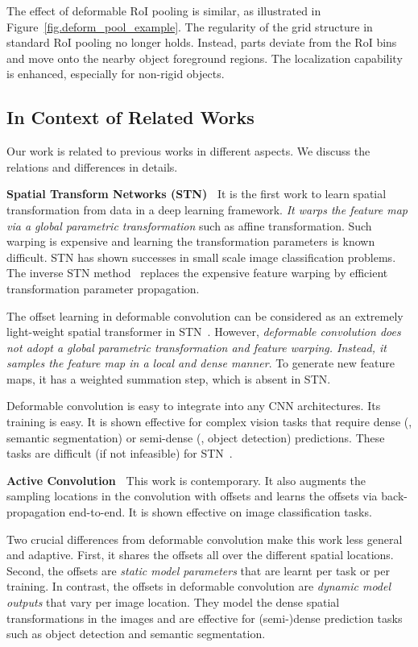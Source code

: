 \documentclass[10pt,twocolumn,letterpaper]{article}
\begin{document}
The effect of deformable RoI pooling is similar, as illustrated in Figure~\ref{fig.deform_pool_example}. The regularity of the grid structure in standard RoI pooling no longer holds. Instead, parts deviate from the RoI bins and move onto the nearby object foreground regions. The localization capability is enhanced, especially for non-rigid objects.

\subsection{In Context of Related Works}
\label{sec.related_work}

Our work is related to previous works in different aspects. We discuss the relations and differences in details.

\textbf{Spatial Transform Networks (STN)~\cite{Jaderberg2015}} It is the first work to learn spatial transformation from data in a deep learning framework. \emph{It warps the feature map via a global parametric transformation} such as affine transformation. Such warping is expensive and learning the transformation parameters is known difficult. STN has shown successes in small scale image classification problems. The inverse STN method~\cite{lin2016inverse} replaces the expensive feature warping by efficient transformation parameter propagation.

The offset learning in deformable convolution can be considered as an extremely light-weight spatial transformer in STN~\cite{Jaderberg2015}. However, \emph{deformable convolution does not adopt a global parametric transformation and feature warping. Instead, it samples the feature map in a local and dense manner}. To generate new feature maps, it has a weighted summation step, which is absent in STN.

Deformable convolution is easy to integrate into any CNN architectures. Its training is easy. It is shown effective for complex vision tasks that require dense (\eg, semantic segmentation) or semi-dense (\eg, object detection) predictions. These tasks are difficult (if not infeasible) for STN~\cite{Jaderberg2015,lin2016inverse}.

\textbf{Active Convolution~\cite{jeon_cvpr2017active}} This work is contemporary. It also augments the sampling locations in the convolution with offsets and learns the offsets via back-propagation end-to-end. It is shown effective on image classification tasks. 

Two crucial differences from deformable convolution make this work less general and adaptive. First, it shares the offsets all over the different spatial locations. Second, the offsets are \emph{static model parameters} that are learnt per task or per training. In contrast, the offsets in deformable convolution are \emph{dynamic model outputs}  that vary per image location. They model the dense spatial transformations in the images and are effective for (semi-)dense prediction tasks such as object detection and semantic segmentation.
\end{document}
